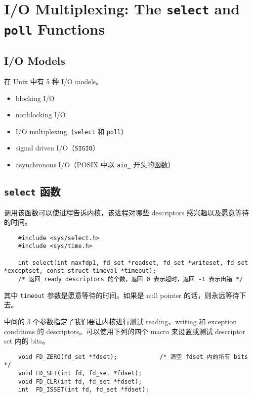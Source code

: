 \section{I/O Multiplexing: The \texttt{select} and \texttt{poll} Functions}

  \subsection{I/O Models}

    在 Unix 中有 5 种 I/O models。

    \begin{itemize}
      \item blocking I/O
      \item nonblocking I/O
      \item I/O multiplexing（\texttt{select} 和 \texttt{poll}）
      \item signal driven I/O（\texttt{SIGIO}）
      \item asynchronous I/O（POSIX 中以 \texttt{aio\_} 开头的函数）
    \end{itemize}

  \subsection{\texttt{select} 函数}

    调用该函数可以使进程告诉内核，该进程对哪些 descriptors 感兴趣以及愿意等待的时间。

    \begin{verbatim}
    #include <sys/select.h>
    #include <sys/time.h>

    int select(int maxfdp1, fd_set *readset, fd_set *writeset, fd_set *exceptset, const struct timeval *timeout);
    /* 返回 ready descriptors 的个数，返回 0 表示超时，返回 -1 表示出错 */
    \end{verbatim}

    其中 \texttt{timeout} 参数是愿意等待的时间。如果是 null pointer 的话，则永远等待下去。

    中间的 3 个参数指定了我们要让内核进行测试 reading、writing 和 exception conditions 的 descriptors。可以使用下列的四个 macro 来设置或测试 descriptor set 内的 bits。

    \begin{verbatim}
    void FD_ZERO(fd_set *fdset);            /* 清空 fdset 内的所有 bits */
    void FD_SET(int fd, fd_set *fdset);
    void FD_CLR(int fd, fd_set *fdset);
    int  FD_ISSET(int fd, fd_set *fdset);
    \end{verbatim}
  
